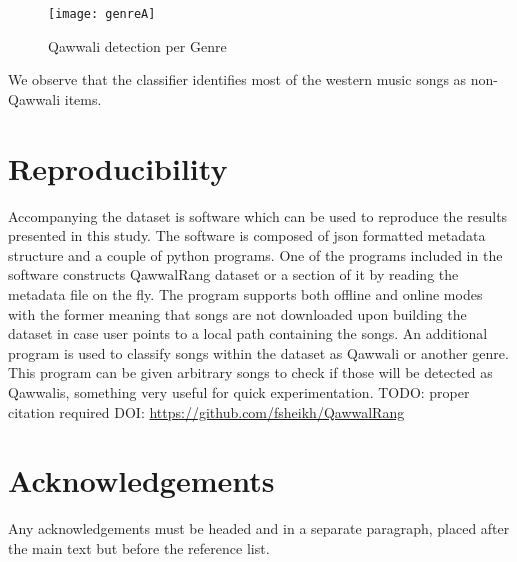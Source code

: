 \documentclass{article}
\begin{document}
\begin{figure}[htbp]
  \centering
  \texttt{[image: genreA]}
  \caption{Qawwali detection per Genre}
\label{fig:src_genre}
\end{figure}
We observe that the classifier identifies most of the western music songs as non-Qawwali items. 
\section{Reproducibility}
Accompanying the dataset is software which can be used to reproduce the results presented in this study. The software is composed of json formatted metadata structure and a couple of python programs. One of the programs included in the software constructs QawwalRang dataset or a section of it by reading the metadata file on the fly. The program supports both offline and online modes with the former meaning that songs are not downloaded upon building the dataset in case user points to a local path containing the songs. An additional program is used to classify songs within the dataset as Qawwali or another genre. This program can be given arbitrary songs to check if those will be detected as Qawwalis, something very useful for quick experimentation. TODO: proper citation required DOI: \url{https://github.com/fsheikh/QawwalRang} 


\section*{Acknowledgements}

Any acknowledgements must be headed and in a separate paragraph,
placed after the main text but before the reference list.




%
%
%
%
\end{document}
